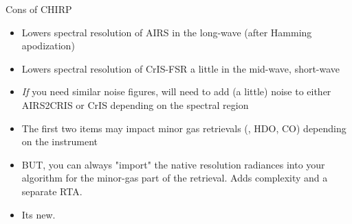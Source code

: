 \documentclass[10pt,t]{beamer}
\begin{document}
\begin{frame}[label={sec:orgf377716}]{Cons of CHIRP}
\begin{itemize}
\item Lowers spectral resolution of AIRS in the long-wave (after Hamming apodization)
\item Lowers spectral resolution of CrIS-FSR a little in the mid-wave, short-wave
\item \emph{If} you need similar noise figures, will need to add (a little) noise to either AIRS2CRIS or CrIS depending on the spectral region
\item The first two items may impact minor gas retrievals (\methane, HDO, CO) depending on the instrument
\item BUT, you can always "import" the native resolution radiances into your algorithm for the minor-gas part of the retrieval.  Adds complexity and a separate RTA.
\item Its new.
\end{itemize}
\end{frame}
\end{document}
